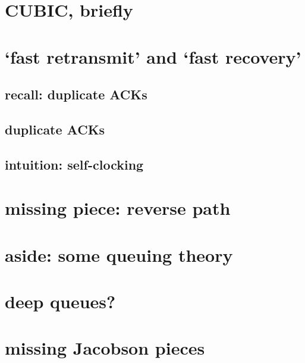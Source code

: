 
\section{CUBIC, briefly}



\section{`fast retransmit' and `fast recovery'}

\subsection{recall: duplicate ACKs}


\subsection{duplicate ACKs}

\subsection{intuition: self-clocking}


\section{missing piece: reverse path}


\section{aside: some queuing theory}


\section{deep queues?}


\section{missing Jacobson pieces}
